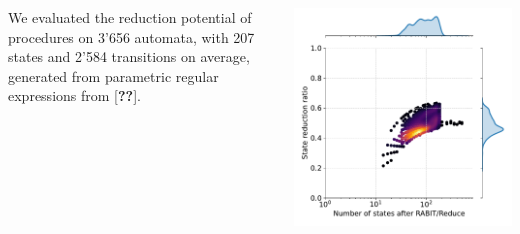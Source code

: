 \documentclass[25pt, a1paper, portrait]{tikzposter}
\begin{document}
\begin{columns}
    {
        We evaluated the reduction potential of procedures on 3'656 automata, with 207 states and 2'584 transitions on average, generated from parametric regular expressions from [\textbf{??}].

        \begin{tikzfigure}
            \centering
            \begin{minipage}{0.21\textwidth}
                \centering
                \includegraphics[width=1\linewidth]{images/intersect-all-states.pdf}
            \end{minipage}
            \begin{minipage}{0.21\textwidth}
                \centering

\end{minipage}
\end{tikzfigure}}
\end{columns}
\end{document}
